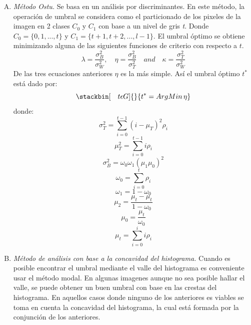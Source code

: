\documentclass[12pt]{report}
\begin{document}
\begin{enumerate}[A.]
\item \textit{Método Ostu.} Se basa en un análisis por discriminantes. En este método, la operación de umbral se considera como el particionado de los pixeles de la imagen en 2 clases $C_{0}$ y $C_{1}$ con base a un nivel de gris \textit{t}. Donde $C_{0} = \{0,1, ...,t\}$ y $C_{1} = \{t + 1, t +2, ..., l - 1\}$. El umbral óptimo se obtiene minimizando alguna de las siguientes funciones de criterio con respecto a $t$.
\begin{equation} \lambda = \frac{\sigma_{B}^{2}}{\sigma_{W}^{2}},\quad \eta = \frac{\sigma_{B}^{2}}{\sigma_{T}^{2}}\quad and \quad \kappa = \frac{\sigma_{T}^{2}}{\sigma_{W}^{2}} \end{equation}
De las tres ecuaciones anteriores $\eta$ es la más simple. Así el umbral óptimo $t^{*}$ está dado por:
\begin{equation}  \stackbin[\quad t \epsilon G]{}{t^{*} = ArgMin\,\eta} \end{equation}
donde:
\begin{equation}\sigma_{T}^{2} = \sum_{i = 0}^{t - 1}(i - \mu_{T})^2\rho_{i} \end{equation}
\begin{equation}\mu_{T}^{2} = \sum_{i = 0}^{t - 1} i\rho_{i} \end{equation}
\begin{equation}\sigma_{B}^{2} = \omega_{0}\omega_{1}(\mu_{1}\mu_{0})^2 \end{equation}
\begin{equation}\omega_{0} = \sum_{i = 0}^{t}\rho_{i} \end{equation}
\begin{equation}\omega_{1} = 1 - \omega_{0} \end{equation}
\begin{equation}\mu_{2} = \frac{\mu_{t} - \mu_{t}}{1 - \omega_{0}} \end{equation}
\begin{equation}\mu_{0} = \frac{\mu_{t}}{\omega_{0}} \end{equation}
\begin{equation}\mu_{t} = \sum_{i = 0}^{i}i\rho_{i} \end{equation}

\item \textit{Método de análisis con base a la concavidad del histograma.} Cuando es posible encontrar el umbral mediante el valle del histograma es conveniente usar el método modal. En algunas imagenes aunque no sea posible hallar el valle, se puede obtener un buen umbral con base en las crestas del histograma. En aquellos casos donde ninguno de los anteriores es viables se toma en cuenta la concavidad del histograma, la cual está formada por la conjunción de los anteriores.


\end{enumerate}
\end{document}

